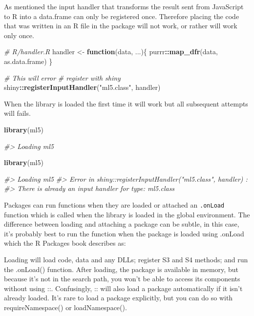 \documentclass[
]{krantz}
\makeatletter
\newenvironment{Shaded}{\begin{snugshade}}{\end{snugshade}}
\newcommand{\CommentTok}[1]{\textcolor[rgb]{0.37,0.37,0.37}{\textit{#1}}}
\newcommand{\ControlFlowTok}[1]{\textcolor[rgb]{0.27,0.27,0.27}{\textbf{#1}}}
\newcommand{\KeywordTok}[1]{\textcolor[rgb]{0.27,0.27,0.27}{\textbf{#1}}}
\newcommand{\NormalTok}[1]{#1}
\newcommand{\OperatorTok}[1]{\textcolor[rgb]{0.43,0.43,0.43}{\textbf{#1}}}
\newcommand{\StringTok}[1]{\textcolor[rgb]{0.5,0.5,0.5}{#1}}
\renewenvironment{quote}{\begin{VF}}{\end{VF}}
\newenvironment{kframe}{%
\medskip{}
\setlength{\fboxsep}{.8em}
 \def\at@end@of@kframe{}%
 \ifinner\ifhmode%
  \def\at@end@of@kframe{\end{minipage}}%
  \begin{minipage}{\columnwidth}%
 \fi\fi%
 \def\FrameCommand##1{\hskip\@totalleftmargin \hskip-\fboxsep
 \colorbox{shadecolor}{##1}\hskip-\fboxsep
     \hskip-\linewidth \hskip-\@totalleftmargin \hskip\columnwidth}%
 \MakeFramed {\advance\hsize-\width
   \@totalleftmargin\z@ \linewidth\hsize
   \@setminipage}}%
 {\par\unskip\endMakeFramed%
 \at@end@of@kframe}
\renewenvironment{Shaded}{\begin{kframe}}{\end{kframe}}
\makeatother
\begin{document}
As mentioned the input handler that transforms the result sent from JavaScript to R into a data.frame can only be registered once. Therefore placing the code that was written in an R file in the package will not work, or rather will work only once.

\begin{Shaded}
\begin{Highlighting}[]
\CommentTok{\# R/handler.R}
\NormalTok{handler <{-}}\StringTok{ }\ControlFlowTok{function}\NormalTok{(data, ...)\{}
\NormalTok{  purrr}\OperatorTok{::}\KeywordTok{map\_dfr}\NormalTok{(data, as.data.frame)}
\NormalTok{\}}

\CommentTok{\# This will error}
\CommentTok{\# register with shiny}
\NormalTok{shiny}\OperatorTok{::}\KeywordTok{registerInputHandler}\NormalTok{(}\StringTok{"ml5.class"}\NormalTok{, handler)}
\end{Highlighting}
\end{Shaded}

When the library is loaded the first time it will work but all subsequent attempts will fails.

\begin{Shaded}
\begin{Highlighting}[]
\KeywordTok{library}\NormalTok{(ml5)}

\CommentTok{\#> Loading ml5}

\KeywordTok{library}\NormalTok{(ml5)}

\CommentTok{\#> Loading ml5}
\CommentTok{\#> Error in shiny::registerInputHandler("ml5.class", handler) : }
\CommentTok{\#>   There is already an input handler for type: ml5.class}
\end{Highlighting}
\end{Shaded}

Packages can run functions when they are loaded or attached an \texttt{.onLoad} function which is called when the library is loaded in the global environment. The difference between loading and attaching a package can be subtle, in this case, it's probably best to run the function when the package is loaded using .onLoad which the R Packages book describes as:

\begin{quote}
Loading will load code, data and any DLLs; register S3 and S4 methods; and run the .onLoad() function. After loading, the package is available in memory, but because it's not in the search path, you won't be able to access its components without using ::. Confusingly, :: will also load a package automatically if it isn't already loaded. It's rare to load a package explicitly, but you can do so with requireNamespace() or loadNamespace().
\end{quote}
\end{document}
